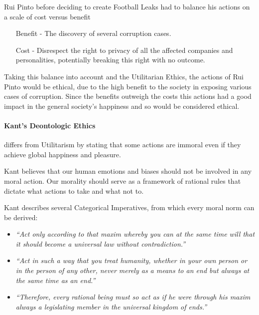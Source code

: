     Rui Pinto before deciding to create Football Leaks had to balance his actions on a scale of cost versus benefit
    \begin{enumerate}
        \item [Benefit] - The discovery of several corruption cases.
        \item [Cost] - Disrespect the right to privacy of all the affected companies and personalities, potentially breaking this right with no outcome.
    \end{enumerate}

    Taking this balance into account and the Utilitarian Ethics, the actions of Rui Pinto would be ethical, due to the high benefit to the society in exposing various cases of corruption.
    Since the benefits outweigh the costs this actions had a good impact in the general society's happiness and so would be considered ethical.

%    
%
\paragraph{Kant's Deontologic Ethics}
    differs from Utilitarism by stating that some actions are immoral even if they achieve global happiness and pleasure.
    
    Kant believes that our human emotions and biases should not be involved in any  moral action.
    Our morality should serve as a framework of rational rules that dictate what actions to take and what not to.
    
    Kant describes several Categorical Imperatives, from which every moral norm can be derived:
    \begin{itemize}
        \item \textit{“Act only according to that maxim whereby you can at the same time will that it should become a universal law without contradiction.”}
        \item \textit{“Act in such a way that you treat humanity, whether in your own person or in the person of any other, never merely as a means to an end but always at the same time as an end.” }
        \item \textit{“Therefore, every rational being must so act as if he were through his maxim always a legislating member in the universal kingdom of ends.”}
    \end{itemize}
    

